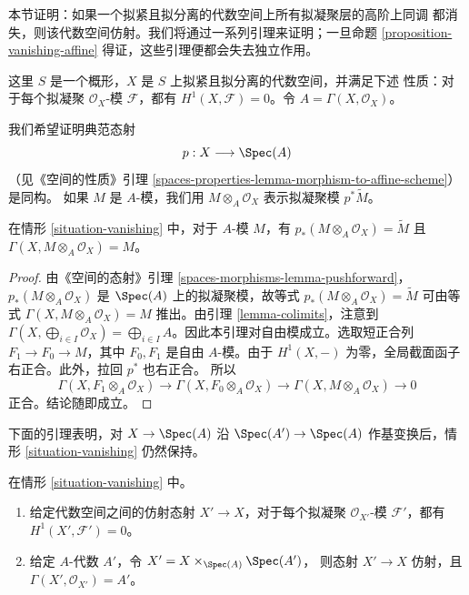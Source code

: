 \noindent
本节证明：如果一个拟紧且拟分离的代数空间上所有拟凝聚层的高阶上同调
都消失，则该代数空间仿射。我们将通过一系列引理来证明；一旦命题
\ref{proposition-vanishing-affine} 得证，这些引理便都会失去独立作用。

\begin{situation}
\label{situation-vanishing}
这里 $S$ 是一个概形，$X$ 是 $S$ 上拟紧且拟分离的代数空间，并满足下述
性质：对于每个拟凝聚 $\mathcal{O}_X$-模 $\mathcal{F}$，都有
$H^1(X, \mathcal{F}) = 0$。令 $A = \Gamma(X, \mathcal{O}_X)$。
\end{situation}

\noindent
我们希望证明典范态射
$$
p : X \longrightarrow \Spec(A)
$$
（见《空间的性质》引理
\ref{spaces-properties-lemma-morphism-to-affine-scheme}）是同构。
如果 $M$ 是 $A$-模，我们用 $M \otimes_A \mathcal{O}_X$ 表示拟凝聚模
$p^*\tilde M$。

\begin{lemma}
\label{lemma-vanishing-compute}
在情形 \ref{situation-vanishing} 中，对于 $A$-模 $M$，有
$p_*(M \otimes_A \mathcal{O}_X) = \widetilde{M}$ 且
$\Gamma(X, M \otimes_A \mathcal{O}_X) = M$。
\end{lemma}

\begin{proof}
由《空间的态射》引理 \ref{spaces-morphisms-lemma-pushforward}，
$p_*(M \otimes_A \mathcal{O}_X)$ 是 $\Spec(A)$ 上的拟凝聚模，故等式
$p_*(M \otimes_A \mathcal{O}_X) = \widetilde{M}$ 可由等式
$\Gamma(X, M \otimes_A \mathcal{O}_X) = M$ 推出。由引理
\ref{lemma-colimits}，注意到
$\Gamma(X, \bigoplus_{i \in I} \mathcal{O}_X) =
\bigoplus_{i \in I} A$。因此本引理对自由模成立。选取短正合列
$F_1 \to F_0 \to M$，其中 $F_0,F_1$ 是自由 $A$-模。由于
$H^1(X, -)$ 为零，全局截面函子右正合。此外，拉回 $p^*$ 也右正合。
所以
$$
\Gamma(X, F_1 \otimes_A \mathcal{O}_X) \to
\Gamma(X, F_0 \otimes_A \mathcal{O}_X) \to
\Gamma(X, M \otimes_A \mathcal{O}_X) \to 0
$$
正合。结论随即成立。
\end{proof}

\noindent
下面的引理表明，对 $X \to \Spec(A)$ 沿
$\Spec(A') \to \Spec(A)$ 作基变换后，情形 \ref{situation-vanishing}
仍然保持。

\begin{lemma}
\label{lemma-vanishing-base-change}
在情形 \ref{situation-vanishing} 中。
\begin{enumerate}
\item 给定代数空间之间的仿射态射 $X' \to X$，对于每个拟凝聚
$\mathcal{O}_{X'}$-模 $\mathcal{F}'$，都有
$H^1(X', \mathcal{F}') = 0$。
\item 给定 $A$-代数 $A'$，令 $X' = X \times_{\Spec(A)} \Spec(A')$，
则态射 $X' \to X$ 仿射，且 $\Gamma(X', \mathcal{O}_{X'}) = A'$。
\end{enumerate}
\end{lemma}

